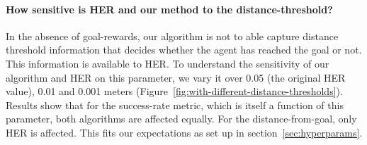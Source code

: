 \paragraph{How sensitive is HER and our method to the distance-threshold?}
In the absence of goal-rewards, our algorithm is not to able capture distance
threshold information that decides whether the agent has reached the goal or
not. This information is available to HER. To understand the
sensitivity of our algorithm and HER on this parameter, we vary it over
0.05 (the original HER value), 0.01 and 0.001 meters
(Figure~\ref{fig:with-different-distance-thresholds}). Results show that
for the success-rate metric, which is itself a function of this
parameter, both algorithms are affected equally. For the distance-from-goal,
only HER is affected. This fits our expectations as set up in 
section~\ref{sec:hyperparams}.




